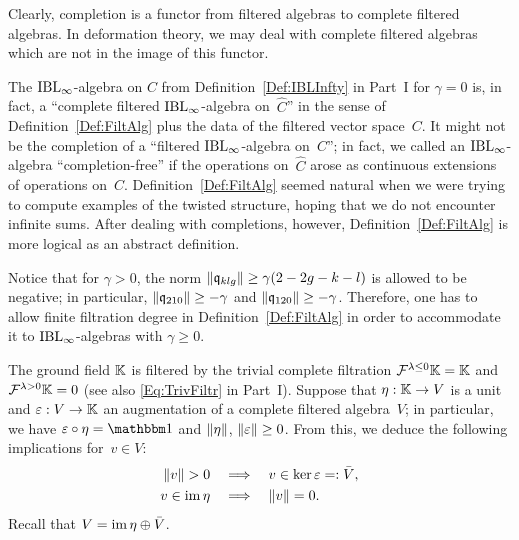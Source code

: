\documentclass[\MainFolder/Text.tex]{subfiles}
\begin{document}
\begin{Remark}
\begin{RemarkList}
\item Clearly, completion is a functor from filtered algebras to complete filtered algebras. In deformation theory, we may deal with complete filtered algebras which are not in the image of this functor.
\item  The $\mathrm{IBL}_\infty$-algebra on $C$ from Definition~\ref{Def:IBLInfty} in Part~I for $\gamma = 0$ is, in fact, a ``complete filtered $\mathrm{IBL}_\infty$-algebra on~$\hat{C}$'' in the sense of Definition~\ref{Def:FiltAlg} plus the data of the filtered vector space~$C$. It might not be the completion of a ``filtered $\mathrm{IBL}_\infty$-algebra on~$C$''; in fact, we called an $\mathrm{IBL}_\infty$-algebra ``completion-free'' if the operations on~$\hat{C}$ arose as continuous extensions of operations on~$C$. Definition~\ref{Def:FiltAlg} seemed natural when we were trying to compute examples of the twisted structure, hoping that we do not encounter infinite sums. After dealing with completions, however, Definition~\ref{Def:FiltAlg} is more logical as an abstract definition.

Notice that for $\gamma > 0$, the norm $\| \mathfrak{q}_{klg} \| \ge \gamma(2-2g-k-l)$ is allowed to be negative; in particular, $\| \mathfrak{q}_{210} \|\ge -\gamma$ and $\| \mathfrak{q}_{120} \|\ge -\gamma$. Therefore, one has to allow finite filtration degree in Definition~\ref{Def:FiltAlg} in order to accommodate it to $\mathrm{IBL}_\infty$-algebras with $\gamma \ge 0$.
\end{RemarkList}
\end{Remark}

\begin{Remark}\label{Rem:FiltrUnitAug}
The ground field $\mathbb{K}$ is filtered by the trivial complete filtration $\mathcal{F}^{\lambda\le 0}\mathbb{K} = \mathbb{K}$ and $\mathcal{F}^{\lambda>0}\mathbb{K} = 0$ (see also \eqref{Eq:TrivFiltr} in Part~I). Suppose that $\eta: \mathbb{K} \rightarrow V$ is a unit and $\varepsilon: V \rightarrow \mathbb{K}$ an augmentation of a complete filtered algebra~$V$; in particular, we have $\MVAug \circ \MVUnit = \Id$ and $\| \eta \|$, $\| \varepsilon \|\ge 0$. From this, we deduce the following implications for~$v\in V$:
\begin{align*}
\Norm{v}>0 &\quad\Implies\quad v\in \ker \MVAug =: \bar{V},\\
v\in \im \MVUnit &\quad\Implies\quad \Norm{v} = 0.
\end{align*}
Recall that $V = \operatorname{im} \eta \oplus \bar{V}$.
\end{Remark}
\end{document}
